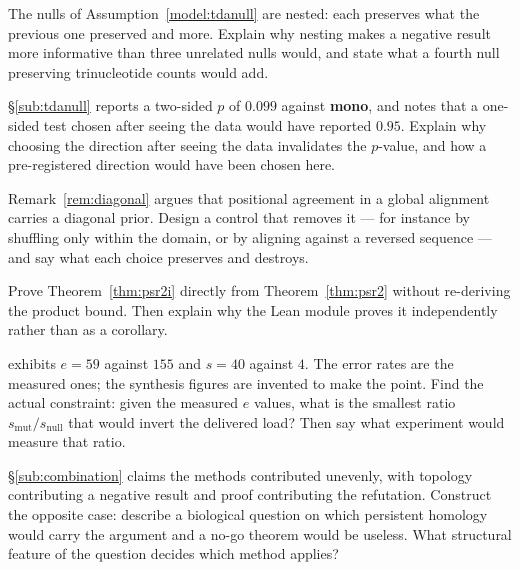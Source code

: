 \begin{exercise}
The nulls of Assumption~\ref{model:tdanull} are nested: each preserves what the
previous one preserved and more. Explain why nesting makes a negative result more
informative than three unrelated nulls would, and state what a fourth null
preserving trinucleotide counts would add.
\end{exercise}

\begin{exercise}
\S\ref{sub:tdanull} reports a two-sided $p$ of $0.099$ against \textbf{mono},
and notes that a one-sided test chosen after seeing the data would have reported
$0.95$. Explain why choosing the direction after seeing the data invalidates the
$p$-value, and how a pre-registered direction would have been chosen here.
\end{exercise}

\begin{exercise}
Remark~\ref{rem:diagonal} argues that positional agreement in a global alignment
carries a diagonal prior. Design a control that removes it --- for instance by
shuffling only within the domain, or by aligning against a reversed sequence ---
and say what each choice preserves and destroys.
\end{exercise}

\begin{exercise}
Prove Theorem~\ref{thm:psr2i} directly from Theorem~\ref{thm:psr2} without
re-deriving the product bound. Then explain why the Lean module proves it
independently rather than as a corollary.
\end{exercise}

\begin{exercise}[(harder)]
 exhibits $e = 59$ against $155$ and
$s = 40$ against $4$. The error rates are the measured ones; the synthesis
figures are invented to make the point. Find the actual constraint: given the
measured $e$ values, what is the smallest ratio $s_{\mathrm{mut}}/s_{\mathrm{null}}$
that would invert the delivered load? Then say what experiment would measure
that ratio.
\end{exercise}

\begin{exercise}[(harder)]
\S\ref{sub:combination} claims the methods contributed unevenly, with topology
contributing a negative result and proof contributing the refutation. Construct
the opposite case: describe a biological question on which persistent homology
would carry the argument and a no-go theorem would be useless. What structural
feature of the question decides which method applies?
\end{exercise}

